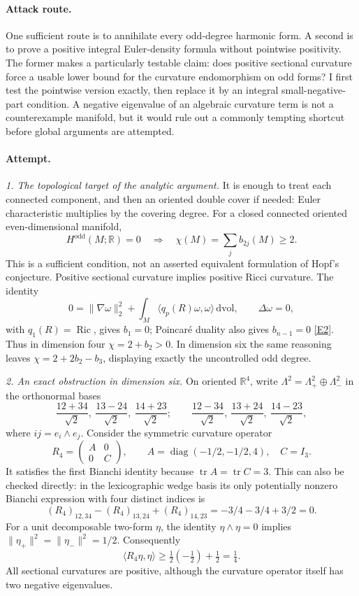 \documentclass[11pt,a4paper]{article}
\newcommand{\R}{\mathbb{R}}
\newcommand{\eref}[2]{\hyperlink{extra:#1:#2}{[E#2]}}
\begin{document}
\paragraph{Attack route.}
One sufficient route is to annihilate every odd-degree harmonic form. A second
is to prove a positive integral Euler-density formula without pointwise
positivity. The former makes a particularly testable claim: does positive
sectional curvature force a usable lower bound for the curvature endomorphism
on odd forms? I first test the pointwise version exactly, then replace it by
an integral small-negative-part condition. A negative eigenvalue of an
algebraic curvature term is not a counterexample manifold, but it would rule
out a commonly tempting shortcut before global arguments are attempted.

\paragraph{Attempt.}
\textit{1. The topological target of the analytic argument.}
It is enough to treat each connected component, and then an oriented double
cover if needed: Euler characteristic multiplies by the covering degree.
For a closed connected oriented even-dimensional manifold,
\[
 H^{\mathrm{odd}}(M;\R)=0\quad\Longrightarrow\quad
 \chi(M)=\sum_j b_{2j}(M)\ge2.
\]
This is a sufficient condition, not an asserted equivalent formulation of
Hopf's conjecture. Positive sectional curvature implies positive Ricci
curvature. The identity
\[
 0=\|\nabla\omega\|_2^2+
   \int_M\langle q_p(R)\omega,\omega\rangle\,\mathrm{dvol},
 \qquad \Delta\omega=0,
\]
with $q_1(R)=\operatorname{Ric}$, gives $b_1=0$; Poincar\'e duality also gives
$b_{n-1}=0$ \eref{30001953}{2}. Thus in dimension four
$\chi=2+b_2>0$. In dimension six the same reasoning leaves
$\chi=2+2b_2-b_3$, displaying exactly the uncontrolled odd degree.

\textit{2. An exact obstruction in dimension six.}
On oriented $\R^4$, write $\Lambda^2=\Lambda^2_+\oplus\Lambda^2_-$ in the
orthonormal bases
\[
 \frac{12+34}{\sqrt2},\ \frac{13-24}{\sqrt2},\
 \frac{14+23}{\sqrt2};\qquad
 \frac{12-34}{\sqrt2},\ \frac{13+24}{\sqrt2},\
 \frac{14-23}{\sqrt2},
\]
where $ij=e_i\wedge e_j$. Consider the symmetric curvature operator
\[
 R_4=\begin{pmatrix}A&0\\0&C\end{pmatrix},\qquad
 A=\operatorname{diag}(-1/2,-1/2,4),\quad C=I_3.
\]
It satisfies the first Bianchi identity because $\operatorname{tr}A=
\operatorname{tr}C=3$. This can also be checked directly: in the lexicographic
wedge basis its only potentially nonzero Bianchi expression with four
distinct indices is
\[
 (R_4)_{12,34}-(R_4)_{13,24}+(R_4)_{14,23}
 =-3/4-3/4+3/2=0.
\]
For a unit decomposable two-form $\eta$, the identity
$\eta\wedge\eta=0$ implies $\|\eta_+\|^2=\|\eta_-\|^2=1/2$.
Consequently
\[
 \langle R_4\eta,\eta\rangle\ge\tfrac12(-\tfrac12)+\tfrac12=\tfrac14.
\]
All sectional curvatures are positive, although the curvature operator itself
has two negative eigenvalues.
\end{document}
